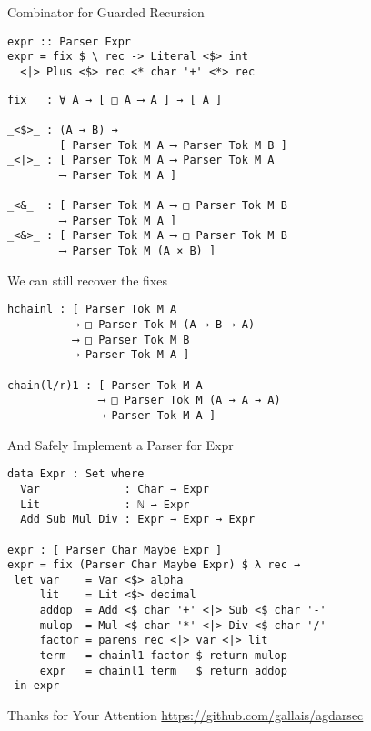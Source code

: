 \documentclass{beamer}
\begin{document}
\begin{frame}[fragile]{Combinator for Guarded Recursion}
\begin{mdframed}[backgroundcolor=lightgray]
\begin{verbatim}
expr :: Parser Expr
expr = fix $ \ rec -> Literal <$> int
  <|> Plus <$> rec <* char '+' <*> rec
\end{verbatim}
\end{mdframed}

\begin{verbatim}
fix   : ∀ A → [ □ A ⟶ A ] → [ A ]

_<$>_ : (A → B) →
        [ Parser Tok M A ⟶ Parser Tok M B ]
_<|>_ : [ Parser Tok M A ⟶ Parser Tok M A
        ⟶ Parser Tok M A ]

_<&_  : [ Parser Tok M A ⟶ □ Parser Tok M B
        ⟶ Parser Tok M A ]
_<&>_ : [ Parser Tok M A ⟶ □ Parser Tok M B
        ⟶ Parser Tok M (A × B) ]
\end{verbatim}
\end{frame}

\begin{frame}[fragile]{We can still recover the fixes}
\begin{verbatim}
hchainl : [ Parser Tok M A
          ⟶ □ Parser Tok M (A → B → A)
          ⟶ □ Parser Tok M B
          ⟶ Parser Tok M A ]

chain(l/r)1 : [ Parser Tok M A
              ⟶ □ Parser Tok M (A → A → A)
              ⟶ Parser Tok M A ]
\end{verbatim}
\end{frame}

\begin{frame}[fragile]{And Safely Implement a Parser for Expr}
\begin{verbatim}
data Expr : Set where
  Var             : Char → Expr
  Lit             : ℕ → Expr
  Add Sub Mul Div : Expr → Expr → Expr

expr : [ Parser Char Maybe Expr ]
expr = fix (Parser Char Maybe Expr) $ λ rec →
 let var    = Var <$> alpha
     lit    = Lit <$> decimal
     addop  = Add <$ char '+' <|> Sub <$ char '-'
     mulop  = Mul <$ char '*' <|> Div <$ char '/'
     factor = parens rec <|> var <|> lit
     term   = chainl1 factor $ return mulop
     expr   = chainl1 term   $ return addop
 in expr
\end{verbatim}
\end{frame}

\begin{frame}[fragile]{Thanks for Your Attention}
\url{https://github.com/gallais/agdarsec}
\end{frame}
\end{document}
